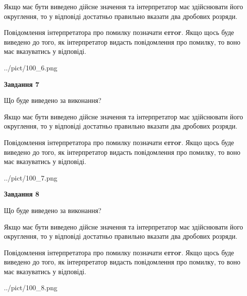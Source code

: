 \documentclass[12pt, ukrainian]{article}
\begin{document}
{\begin {Large}
Якщо має бути виведено дійсне значення та інтерпретатор має здійснювати його округлення, 
то у відповіді достатньо правильно вказати два дробових розряди.

Повідомлення інтерпретатора про помилку позначати \textbf{error}.
Якщо щось буде виведено до того, як інтерпретатор видасть повідомлення про помилку, 
то воно має вказуватись у відповіді. \par

\begin{center}
	{../pict/100_6.png}
\end{center}
\newpage

{\begin {center}\textbf{Завдання 7}\end {center}}\par
Що буде виведено за виконання? \par

Якщо має бути виведено дійсне значення та інтерпретатор має здійснювати його округлення, 
то у відповіді достатньо правильно вказати два дробових розряди.

Повідомлення інтерпретатора про помилку позначати \textbf{error}.
Якщо щось буде виведено до того, як інтерпретатор видасть повідомлення про помилку, 
то воно має вказуватись у відповіді. \par

\begin{center}
	{../pict/100_7.png}
\end{center}
\newpage

{\begin {center}\textbf{Завдання 8}\end {center}}\par
Що буде виведено за виконання? \par

Якщо має бути виведено дійсне значення та інтерпретатор має здійснювати його округлення, 
то у відповіді достатньо правильно вказати два дробових розряди.

Повідомлення інтерпретатора про помилку позначати \textbf{error}.
Якщо щось буде виведено до того, як інтерпретатор видасть повідомлення про помилку, 
то воно має вказуватись у відповіді. \par

\begin{center}
	{../pict/100_8.png}
\end{center}
\newpage


\end{Large}}
\end{document}
